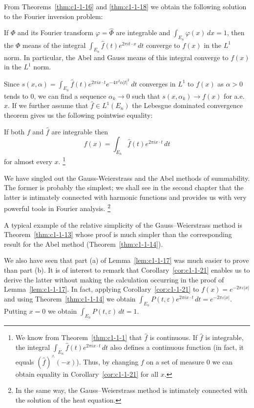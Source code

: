 From Theorems~\ref{thm:c1-1-16} and \ref{thm:c1-1-18} we obtain the following
solution to the Fourier inversion problem:

\begin{theorem}\label{thm:c1-1-20}
If $\Phi$ and its Fourier transform $\varphi = \hat{\Phi}$ are integrable and
$\int_{E_{n}} \varphi(x) \, dx = 1$, then the $\Phi$ means of the integral
$\int_{E_{n}} \hat{f}(t) e^{2\pi i t \cdot x} \, dt$ converge to $f(x)$ in the
$L^{1}$ norm. In particular, the Abel and Gauss means of this integral converge
to $f(x)$ in the $L^{1}$ norm.
\end{theorem}

Since
$s(x, \alpha) = \int_{E_{n}} \hat{f}(t) e^{2\pi i x \cdot t} e^{-4\pi^{2} \alpha |t|^{2}} \, dt$
converges in $L^{1}$ to $f(x)$ as $\alpha > 0$ tends to $0$, we can find a
sequence $\alpha_{k} \to 0$ such that $s(x, \alpha_{k}) \to f(x)$ for a.e. $x$.
If we further assume that $\hat{f} \in L^{1}(E_{n})$ the Lebesgue dominated
convergence theorem gives us the following pointwise equality:

\begin{corollary}\label{cor:c1-1-21}
If both $f$ and $\hat{f}$ are integrable then
\[
f(x)=\int_{E_{n}}\hat{f}(t)e^{2\pi i x\cdot t}\,dt
\]
for almost every $x$.%
\footnote{We know from Theorem~\ref{thm:c1-1-1} that $\hat{f}$ is continuous.
If $\hat{f}$ is integrable, the integral
$\int_{E_{n}}\hat{f}(t)e^{2\pi i x\cdot t}\,dt$ also defines a continuous
function (in fact, it equals $(\hat{f})^{\wedge}(-x)$). Thus, by changing $f$ on
a set of measure $0$ we can obtain equality in Corollary~\ref{cor:c1-1-21} for
all $x$.}
\end{corollary}

We have singled out the Gauss-Weierstrass and the Abel methods of summability.
The former is probably the simplest; we shall see in the second chapter that the
latter is intimately connected with harmonic functions and provides us with very
powerful tools in Fourier analysis.%
\footnote{In the same way, the Gauss--Weierstrass method is intimately connected
with the solution of the heat equation.}

A typical example of the relative simplicity of the Gauss--Weierstrass method is
Theorem~\ref{thm:c1-1-13} whose proof is much simpler than the corresponding
result for the Abel method (Theorem~\ref{thm:c1-1-14}).

We also have seen that part (a) of Lemma~\ref{lem:c1-1-17} was much easier to
prove than part (b). It is of interest to remark that
Corollary~\ref{cor:c1-1-21} enables us to derive the latter without making the
calculation occurring in the proof of Lemma~\ref{lem:c1-1-17}. In fact, applying
Corollary~\ref{cor:c1-1-21} to $f(x) = e^{-2\pi\varepsilon|x|}$ and using
Theorem~\ref{thm:c1-1-14} we obtain
$\int_{E_{n}} P(t, \varepsilon)e^{2\pi i x \cdot t} \, dt = e^{-2\pi\varepsilon|x|}$.
Putting $x = 0$ we obtain $\int_{E_{n}} P(t, \varepsilon) \, dt = 1$.

